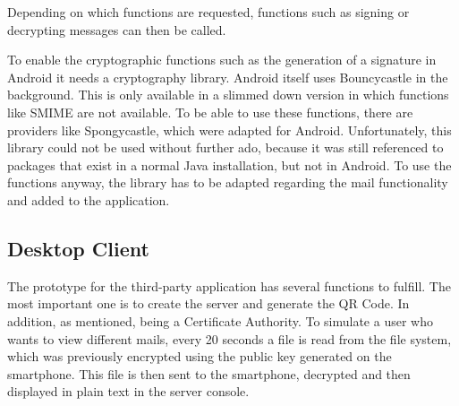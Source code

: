\documentclass[12pt,oneside,a4paper,parskip]{scrbook}
\begin{document}
Depending on which functions are requested, functions such as signing or decrypting messages can then be called. 

To enable the cryptographic functions such as the generation of a signature in Android it needs a cryptography library. Android itself uses Bouncycastle in the background. This is only available in a slimmed down version in which functions like SMIME are not available. To be able to use these functions, there are providers like Spongycastle, which were adapted for Android. Unfortunately, this library could not be used without further ado, because it was still referenced to packages that exist in a normal Java installation, but not in Android. To use the functions anyway, the library has to be adapted regarding the mail functionality and added to the application. \parencite{noauthor_bouncycastle_nodate}

\subsection{Desktop Client}
The prototype for the third-party application has several functions to fulfill. The most important one is to create the server and generate the QR Code. In addition, as mentioned, being a Certificate Authority. To simulate a user who wants to view different mails, every 20 seconds a file is read from the file system, which was previously encrypted using the public key generated on the smartphone. This file is then sent to the smartphone, decrypted and then displayed in plain text in the server console. 
\end{document}
